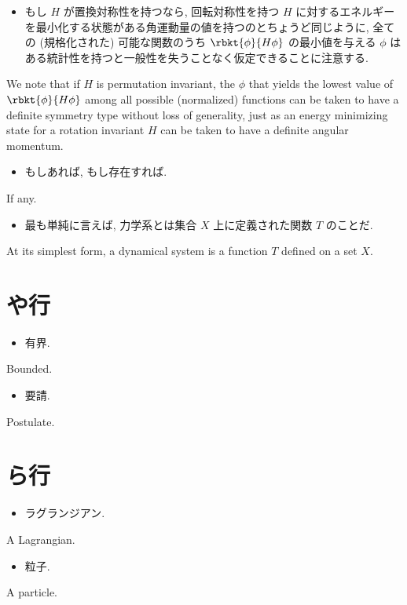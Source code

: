 \documentclass[openany, a4paper, oneside]{jsbook}
\begin{document}
\begin{itemize}
\item もし $H$ が置換対称性を持つなら, 回転対称性を持つ $H$ に対するエネルギーを最小化する状態がある角運動量の値を持つのとちょうど同じように,
全ての (規格化された) 可能な関数のうち $\rbkt{\phi}{H \phi}$ の最小値を与える
$\phi$ はある統計性を持つと一般性を失うことなく仮定できることに注意する. \cite{LiebSeiringer1}
\end{itemize}
We note that if $H$ is permutation invariant, the $\phi$ that yields the lowest value of $\rbkt{\phi}{H \phi}$ among
all possible (normalized) functions can be taken to have a definite symmetry type without loss of generality,
just as an energy minimizing state for a rotation invariant $H$ can be taken to have a definite angular momentum.

\begin{itemize}
\item もしあれば, もし存在すれば. \cite{LiebSeiringer1}
\end{itemize}
If any.

\begin{itemize}
\item 最も単純に言えば, 力学系とは集合 $X$ 上に定義された関数 $T$ のことだ. \cite{OmriSarig1}
\end{itemize}
At its simplest form, a dynamical system is a function $T$ defined on a set $X$.
\section{や行}

\begin{itemize}
\item 有界.
\end{itemize}
Bounded.

\begin{itemize}
\item 要請.
\end{itemize}
Postulate.
\section{ら行}

\begin{itemize}
\item ラグランジアン.
\end{itemize}
A Lagrangian.

\begin{itemize}
\item 粒子.
\end{itemize}
A particle.
\end{document}

